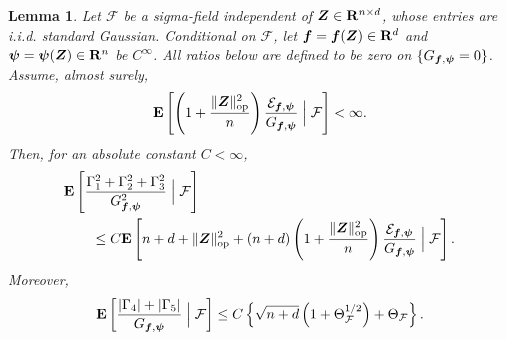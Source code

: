 \documentclass{article}
\theoremstyle{plain} %
\newtheorem{lemma}[theorem]{Lemma}
\theoremstyle{definition} %
\theoremstyle{definition} %
\begin{document}
\begin{lemma}
\label{lem:normalized-Gaussian-Stein}
Let $\mathcal F$ be a sigma-field independent of
$\boldsymbol{Z}\in{\mathbf{R}}^{n\times d}$, whose entries are i.i.d. standard Gaussian.  Conditional
on $\mathcal F$, let $\boldsymbol{f}=\boldsymbol{f}(\boldsymbol{Z})\in{\mathbf{R}}^d$ and
$\boldsymbol\psi=\boldsymbol\psi(\boldsymbol{Z})\in{\mathbf{R}}^n$ be $C^\infty$.
All ratios below are defined to be zero on
$\{G_{\boldsymbol{f},\boldsymbol\psi}=0\}$. Assume, almost surely,
\begin{align*}
    {\mathbf{E}}\left[
       \left(1+\frac{\lVert\boldsymbol{Z}\rVert_{\rm op}^2}{n}\right)
       \frac{{\mathcal E}_{\boldsymbol{f},\boldsymbol\psi}}
            {G_{\boldsymbol{f},\boldsymbol\psi}}
       \mathrel{\Big|}\mathcal F
    \right]<\infty.
\end{align*}
Then, for an absolute constant $C<\infty$,
\begin{align}
    &{\mathbf{E}}\left[
       \frac{\Gamma_1^2+\Gamma_2^2+\Gamma_3^2}
            {G_{\boldsymbol{f},\boldsymbol\psi}^2}
       \mathrel{\Big|}\mathcal F
    \right]\notag\\
    &\qquad\leq
    C{\mathbf{E}}\left[
       n+d+\lVert\boldsymbol{Z}\rVert_{\rm op}^2
       +(n+d)\left(1+\frac{\lVert\boldsymbol{Z}\rVert_{\rm op}^2}{n}\right)
       \frac{{\mathcal E}_{\boldsymbol{f},\boldsymbol\psi}}
            {G_{\boldsymbol{f},\boldsymbol\psi}}
       \mathrel{\Big|}\mathcal F
    \right].
    \label{eq:conditional-normalized-first-order}
\end{align}
Moreover,
\begin{align}
    {\mathbf{E}}\left[
       \frac{|\Gamma_4|+|\Gamma_5|}
            {G_{\boldsymbol{f},\boldsymbol\psi}}
       \mathrel{\Big|}\mathcal F
    \right]
    \leq C\left\{
       \sqrt{n+d}\left(1+\Theta_{\mathcal F}^{1/2}\right)
       +\Theta_{\mathcal F}
    \right\}.
    \label{eq:conditional-normalized-second-order}
\end{align}
\end{lemma}
\end{document}
